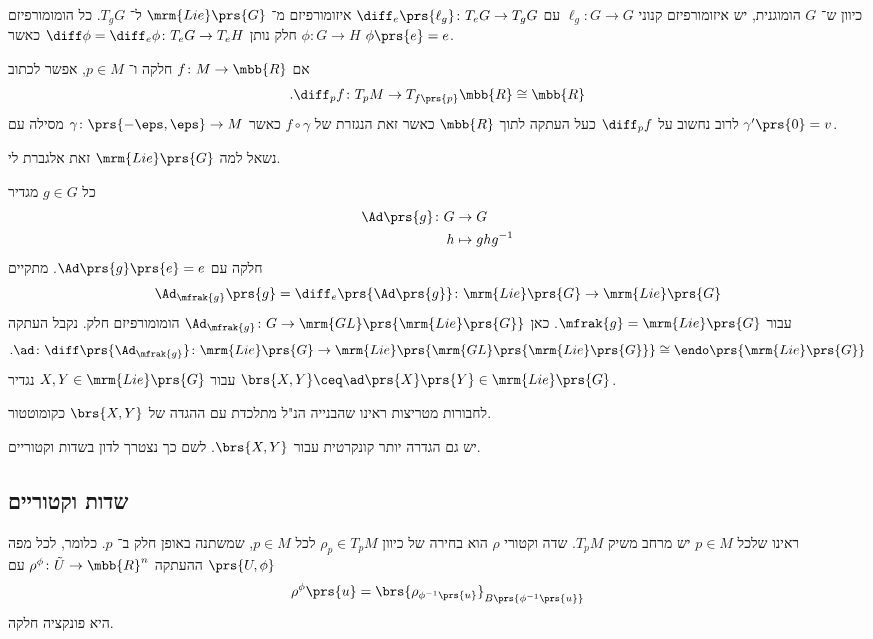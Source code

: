 \documentclass[10pt, twoside]{book}
\newcommand{\Lie}{\mrm{Lie}}
\begin{document}
כיוון ש־%
$G$
הומוגנית, יש איזומורפיזם קנוני
$\ell_g \colon G \to G$
עם
$\diff_e \prs{\ell_g} \colon T_e G \to T_g G$
איזומורפיזם מ־%
$\Lie\prs{G}$
ל־%
$T_g G$.
כל הומומורפיזם
$\phi \colon G \to H$
חלק נותן
$\diff \phi = \diff_e \phi \colon T_e G \to T_e H$
כאשר
$\phi\prs{e} = e$.

\begin{remark}
אם
$f \colon M \to \mbb{R}$
חלקה ו־%
$p \in M$,
אפשר לכתוב
\[\text{.}\diff_p f \colon T_p M \to T_{f\prs{p}} \mbb{R} \cong \mbb{R}\]
לרוב נחשוב על
$\diff_p f$
כעל העתקה לתוך
$\mbb{R}$
כאשר זאת הנגזרת של
$f \circ \gamma$
כאשר
$\gamma \colon \prs{-\eps,\eps} \to M$
מסילה עם
$\gamma'\prs{0} = v$.
\end{remark}

נשאל למה
$\Lie\prs{G}$
זאת אלגברת לי.

כל
$g \in G$
מגדיר
\begin{align*}
\Ad\prs{g} \colon G &\to G \\
h &\mapsto g h g^{-1}
\end{align*}
חלקה עם
$\Ad\prs{g} \prs{e} = e$.
מתקיים
\[\Ad_{\mfrak{g}} \prs{g} = \diff_e\prs{\Ad\prs{g}} \colon \Lie\prs{G} \to \Lie\prs{G}\]
עבור
$\mfrak{g} = \Lie\prs{G}$.
כאן
$\Ad_\mfrak{g} \colon G \to \mrm{GL}\prs{\Lie\prs{G}}$
הומומורפיזם חלק.
נקבל העתקה
\[\text{.} \ad \colon \diff \prs{\Ad_{\mfrak{g}}} \colon \Lie\prs{G} \to \Lie\prs{\mrm{GL}\prs{\Lie\prs{G}}} \cong \endo\prs{\Lie\prs{G}}\]
עבור
$X,Y \in \Lie\prs{G}$
נגדיר
$\brs{X,Y} \ceq \ad\prs{X}\prs{Y} \in \Lie\prs{G}$.

\begin{remark}
לחבורות מטריצות ראינו שהבנייה הנ"ל מתלכדת עם ההגדה של
$\brs{X,Y}$
כקומוטטור.
\end{remark}

יש גם הגדרה יותר קונקרטית עבור
$\brs{X,Y}$.
לשם כך נצטרך לדון בשדות וקטוריים.

\subsection{שדות וקטוריים}

\begin{definition}
ראינו שלכל
$p \in M$
יש מרחב משיק
$T_p M$.
שדה וקטורי
$\rho$
הוא בחירה של כיוון
$\rho_p \in T_p M$
לכל
$p \in M$,
שמשתנה באופן חלק ב־%
$p$.
כלומר, לכל מפה
$\prs{U, \phi}$
ההעתקה
$\rho^\phi \colon \tilde{U} \to \mbb{R}^n$
עם
\[\rho^\phi\prs{u} = \brs{\rho_{\phi^{-1}\prs{u}}}_{B\prs{\phi^{-1}\prs{u}}}\]
היא פונקציה חלקה.
\end{definition}
\end{document}
